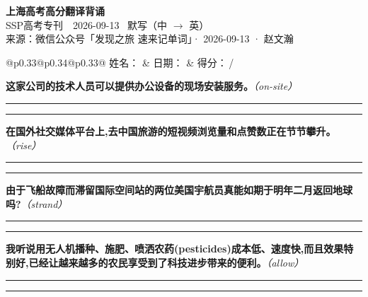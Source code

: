 \documentclass[11pt,a4paper]{article}
\newcommand{\num}[1]{\makebox[1.9em][r]{#1.}\hspace{0.3em}}
\newcommand{\wline}{\noindent\rule{\linewidth}{0.4pt}}
\newcommand{\prompt}[1]{\emph{\textcolor{tipblue}{\small（#1）}}}
\begin{document}
\pagestyle{plain}
\begin{center}
{\LARGE\bfseries 上海高考高分翻译背诵 }\\[0.25em]
{\large SSP高考专刊　2026-09-13 \quad\ 默写（中 $\to$ 英）}\\[0.35em]
{\footnotesize 来源：微信公众号「发现之旅 速来记单词」· 2026-09-13 · 赵文瀚}
\end{center}

\vspace{0.4em}
\noindent\begin{tabular}{@{}p{0.33\textwidth}@{}p{0.34\textwidth}@{}p{0.33\textwidth}@{}}
姓名：\underline{\hspace{2.0cm}} & 日期：\underline{\hspace{2.0cm}} & 得分：\underline{\hspace{1.4cm}}\,/ \\
\end{tabular}

\vspace{0.5em}

\vspace{0.8em}
\num{1}\textbf{这家公司的技术人员可以提供办公设备的现场安装服务。}\prompt{on-site}

\vspace{0.3em}

\wline\vspace{0.3em}
\wline

\num{2}\textbf{在国外社交媒体平台上,去中国旅游的短视频浏览量和点赞数正在节节攀升。}\prompt{rise}

\vspace{0.3em}

\wline\vspace{0.3em}
\wline

\num{3}\textbf{由于飞船故障而滞留国际空间站的两位美国宇航员真能如期于明年二月返回地球吗?}\prompt{strand}

\vspace{0.3em}

\wline\vspace{0.3em}
\wline

\num{4}\textbf{我听说用无人机播种、施肥、喷洒农药(pesticides)成本低、速度快,而且效果特别好,已经让越来越多的农民享受到了科技进步带来的便利。}\prompt{allow}

\vspace{0.3em}

\wline\vspace{0.3em}
\wline
\end{document}
